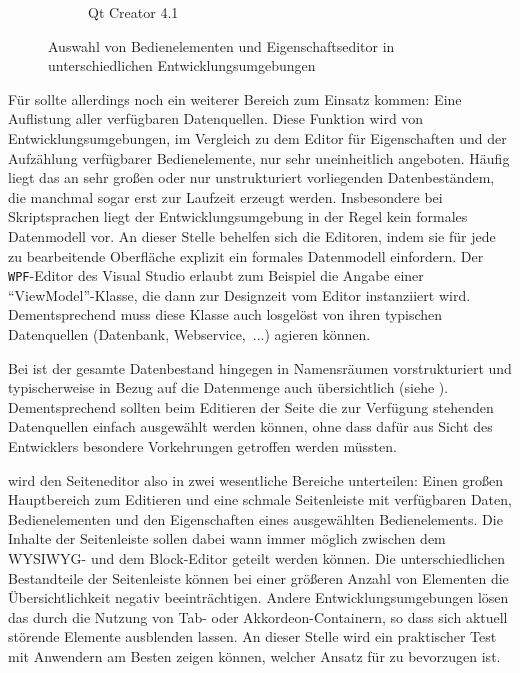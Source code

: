 \begin{figure}[h]
\begin{subfigure}[b]{0.45\textwidth}
    \caption{Qt Creator 4.1}
  \end{subfigure}
  \caption{Auswahl von Bedienelementen und Eigenschaftseditor in unterschiedlichen Entwicklungsumgebungen}
  \label{fig:sidebar-example}
\end{figure}

Für \idename{} sollte allerdings noch ein weiterer Bereich zum Einsatz kommen: Eine Auflistung aller verfügbaren Datenquellen. Diese Funktion wird von Entwicklungsumgebungen, im Vergleich zu dem Editor für Eigenschaften und der Aufzählung verfügbarer Bedienelemente, nur sehr uneinheitlich angeboten. Häufig liegt das an sehr großen oder nur unstrukturiert vorliegenden Datenbeständem, die manchmal sogar erst zur Laufzeit erzeugt werden. Insbesondere bei Skriptsprachen liegt der Entwicklungsumgebung in der Regel kein formales Datenmodell vor. An dieser Stelle behelfen sich die Editoren, indem sie für jede zu bearbeitende Oberfläche explizit ein formales Datenmodell einfordern. Der \texttt{WPF}-Editor des Visual Studio erlaubt zum Beispiel die Angabe einer "`ViewModel"'-Klasse, die dann zur Designzeit vom Editor instanziiert wird. Dementsprechend muss diese Klasse auch losgelöst von ihren typischen Datenquellen (Datenbank, Webservice,~...) agieren können.

Bei \idename{} ist der gesamte Datenbestand hingegen in Namensräumen vorstrukturiert und typischerweise in Bezug auf die Datenmenge auch übersichtlich (siehe ). Dementsprechend sollten beim Editieren der Seite die zur Verfügung stehenden Datenquellen einfach ausgewählt werden können, ohne dass dafür aus Sicht des Entwicklers besondere Vorkehrungen getroffen werden müssten.

\idename{} wird den Seiteneditor also in zwei wesentliche Bereiche unterteilen: Einen großen Hauptbereich zum Editieren und eine schmale Seitenleiste mit verfügbaren Daten, Bedienelementen und den Eigenschaften eines ausgewählten Bedienelements. Die Inhalte der Seitenleiste sollen dabei wann immer möglich zwischen dem WYSIWYG- und dem Block-Editor geteilt werden können. Die unterschiedlichen Bestandteile der Seitenleiste können bei einer größeren Anzahl von Elementen die Übersichtlichkeit negativ beeinträchtigen. Andere Entwicklungsumgebungen lösen das durch die Nutzung von Tab- oder Akkordeon-Containern, so dass sich aktuell störende Elemente ausblenden lassen. An dieser Stelle wird ein praktischer Test mit Anwendern am Besten zeigen können, welcher Ansatz für \idename{} zu bevorzugen ist.

